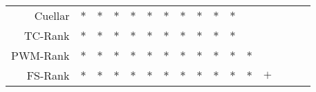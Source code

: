 \documentclass[11pt]{article}
\begin{document}
\begin{table}[h!]
\begin{center}
\begin{tabular}{ rccccccccccccccc }
    Cuellar & $*$ & $*$ & $*$ & $*$ & $*$ & $*$ & $*$ & $*$ & $*$ & $*$ &     &     &     &     &     \\
    TC-Rank & $*$ & $*$ & $*$ & $*$ & $*$ & $*$ & $*$ & $*$ & $*$ & $*$ &     &     &     &     &     \\
    PWM-Rank & $*$ & $*$ & $*$ & $*$ & $*$ & $*$ & $*$ & $*$ & $*$ & $*$ & $*$ &     &     &     &     \\
    FS-Rank & $*$ & $*$ & $*$ & $*$ & $*$ & $*$ & $*$ & $*$ & $*$ & $*$ & $*$ & $+$ &     &     &     \\
    \hline
  \end{tabular}
\end{center}
\vspace{0.0cm}
\end{table}
\end{document}
